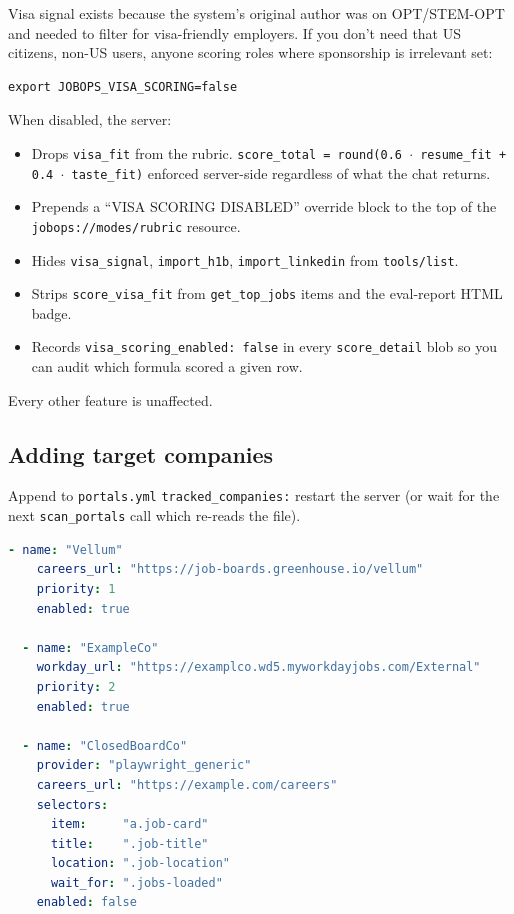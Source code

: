 \documentclass[11pt,letterpaper]{article}
\newcommand{\tool}[1]{\texttt{#1}}
\newcommand{\fpath}[1]{\texttt{#1}}
\begin{document}
Visa signal exists because the system's original author was on OPT/STEM-OPT and needed to filter for visa-friendly employers. If you don't need that \textemdash{} US citizens, non-US users, anyone scoring roles where sponsorship is irrelevant \textemdash{} set:

\begin{lstlisting}[language=bashplus]
export JOBOPS_VISA_SCORING=false
\end{lstlisting}

When disabled, the server:

\begin{itemize}
\item Drops \texttt{visa\_fit} from the rubric. \texttt{score\_total = round(0.6 \(\cdot\) resume\_fit + 0.4 \(\cdot\) taste\_fit)} \textemdash{} enforced server-side regardless of what the chat returns.
\item Prepends a ``VISA SCORING DISABLED'' override block to the top of the \texttt{jobops://modes/rubric} resource.
\item Hides \tool{visa\_signal}, \tool{import\_h1b}, \tool{import\_linkedin} from \texttt{tools/list}.
\item Strips \texttt{score\_visa\_fit} from \tool{get\_top\_jobs} items and the eval-report HTML badge.
\item Records \texttt{visa\_scoring\_enabled: false} in every \texttt{score\_detail} blob so you can audit which formula scored a given row.
\end{itemize}

Every other feature is unaffected.

\subsection*{Adding target companies}

Append to \fpath{portals.yml} \texttt{tracked\_companies:} \textemdash{} restart the server (or wait for the next \tool{scan\_portals} call which re-reads the file).

\begin{lstlisting}[language=yaml]
  - name: "Vellum"
    careers_url: "https://job-boards.greenhouse.io/vellum"
    priority: 1
    enabled: true

  - name: "ExampleCo"
    workday_url: "https://examplco.wd5.myworkdayjobs.com/External"
    priority: 2
    enabled: true

  - name: "ClosedBoardCo"
    provider: "playwright_generic"
    careers_url: "https://example.com/careers"
    selectors:
      item:     "a.job-card"
      title:    ".job-title"
      location: ".job-location"
      wait_for: ".jobs-loaded"
    enabled: false
\end{lstlisting}
\end{document}
